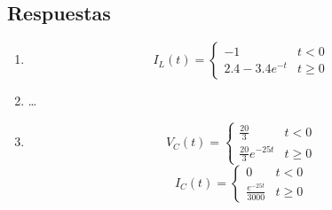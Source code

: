 \subsection{Respuestas}

\begin{enumerate}
    \item 
    \[
        I_L(t) = \begin{cases}
            -1 & t < 0 \\
            2.4 - 3.4 e^{-t} & t \geq 0
        \end{cases}
    \]
    \item \ldots
    \item 
    \[
        V_C(t) = \begin{cases}
            \frac{20}{3} & t < 0 \\
            \frac{20}{3} e^{-25t} & t \geq 0
        \end{cases}
    \]
    \[
        I_C(t) = \begin{cases}
            0 & t < 0 \\
            \frac{e^{-25t}}{3000} & t \geq 0
        \end{cases}
    \]
\end{enumerate}